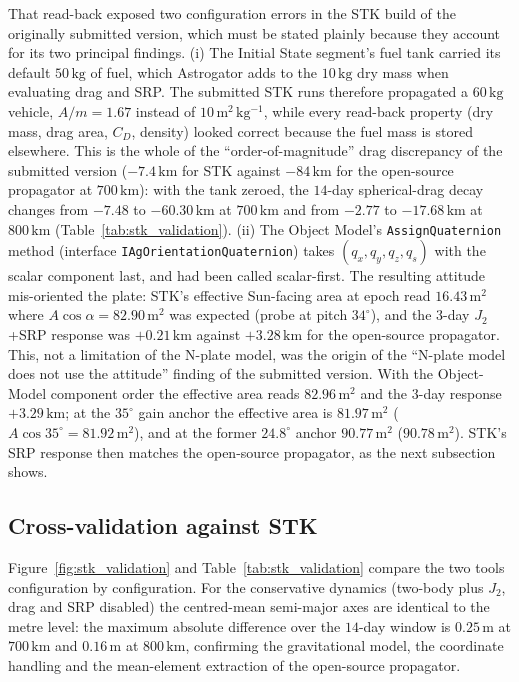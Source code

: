 \vspace{5pt}
\par\noindent That read-back exposed two configuration errors in the STK build of the originally submitted version, which must be stated plainly because they account for its two principal findings. (i) The Initial State segment's fuel tank carried its default \(50\,\mathrm{kg}\) of fuel, which Astrogator adds to the \(10\,\mathrm{kg}\) dry mass when evaluating drag and SRP. The submitted STK runs therefore propagated a \(60\,\mathrm{kg}\) vehicle, \(A/m = 1.67\) instead of \(10\,\mathrm{m^2\,kg^{-1}}\), while every read-back property (dry mass, drag area, \(C_D\), density) looked correct because the fuel mass is stored elsewhere. This is the whole of the ``order-of-magnitude'' drag discrepancy of the submitted version (\(-7.4\,\mathrm{km}\) for STK against \(-84\,\mathrm{km}\) for the open-source propagator at \(700\,\mathrm{km}\)): with the tank zeroed, the \(14\)-day spherical-drag decay changes from \(-7.48\) to \(-60.30\,\mathrm{km}\) at \(700\,\mathrm{km}\) and from \(-2.77\) to \(-17.68\,\mathrm{km}\) at \(800\,\mathrm{km}\) (Table~\ref{tab:stk_validation}). (ii) The Object Model's \texttt{AssignQuaternion} method (interface \texttt{IAgOrientationQuaternion}) takes \((q_x, q_y, q_z, q_s)\) with the scalar component last, and had been called scalar-first. The resulting attitude mis-oriented the plate: STK's effective Sun-facing area at epoch read \(16.43\,\mathrm{m^2}\) where \(A\cos\alpha = 82.90\,\mathrm{m^2}\) was expected (probe at pitch \(34^\circ\)), and the \(3\)-day \(J_2\)+SRP response was \(+0.21\,\mathrm{km}\) against \(+3.28\,\mathrm{km}\) for the open-source propagator. This, not a limitation of the N-plate model, was the origin of the ``N-plate model does not use the attitude'' finding of the submitted version. With the Object-Model component order the effective area reads \(82.96\,\mathrm{m^2}\) and the \(3\)-day response \(+3.29\,\mathrm{km}\); at the \(35^\circ\) gain anchor the effective area is \(81.97\,\mathrm{m^2}\) (\(A\cos 35^\circ = 81.92\,\mathrm{m^2}\)), and at the former \(24.8^\circ\) anchor \(90.77\,\mathrm{m^2}\) (\(90.78\,\mathrm{m^2}\)). STK's SRP response then matches the open-source propagator, as the next subsection shows.

\subsection{Cross-validation against STK}
\label{sec:val_stk}
\noindent Figure~\ref{fig:stk_validation} and Table~\ref{tab:stk_validation} compare the two tools configuration by configuration. For the conservative dynamics (two-body plus \(J_2\), drag and SRP disabled) the centred-mean semi-major axes are identical to the metre level: the maximum absolute difference over the \(14\)-day window is \(0.25\,\mathrm{m}\) at \(700\,\mathrm{km}\) and \(0.16\,\mathrm{m}\) at \(800\,\mathrm{km}\), confirming the gravitational model, the coordinate handling and the mean-element extraction of the open-source propagator.

